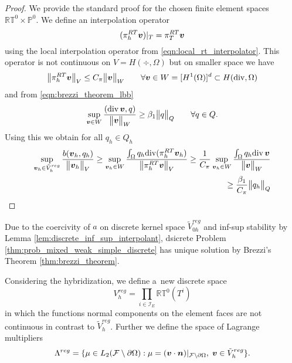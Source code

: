 \begin{proof}
We provide the standard proof for the chosen finite element spaces $\mathbb{RT}^0\times\mathbb{P}^0$.
We define an interpolation operator 
\begin{equation}
    (\pi^{RT}_h \mathbf{\boldsymbol{v}})|_T = \pi^{RT}_T \mathbf{\boldsymbol{v}}
\end{equation}
using the local interpolation operator from \eqref{eqn:local_rt_interpolator}.
This operator is not continuous on $V=H(\div,\Omega)$ but on
smaller space we have
\begin{equation}
    \bigl\Vert\pi^{RT}_h \mathbf{\boldsymbol{v}}\bigr\Vert_V \leq C_\pi \bigl\Vert\mathbf{\boldsymbol{v}}\bigr\Vert_W \qquad \forall \mathbf{\boldsymbol{v}}\in W=[H^1(\Omega)]^d \subset H({\rm div},\Omega)
\end{equation}
and from \eqref{eqn:brezzi_theorem_lbb}
\begin{equation}
    \sup_{\mathbf{\boldsymbol{v}}\in W} \frac{({\rm div}\,\mathbf{\boldsymbol{v}}, q)}{\bigl\Vert\mathbf{\boldsymbol{v}}\bigr\Vert_W} \geq \beta_1 \bigl\Vert q\bigr\Vert_Q \qquad \forall q\in Q.
\end{equation}
Using this we obtain for all $q_h\in Q_h$
\begin{align}
    \sup_{\mathbf{\boldsymbol{v}}_h\in \tilde V^{reg}_h} \frac{b(\mathbf{\boldsymbol{v}}_h,q_h)}{\bigl\Vert\mathbf{\boldsymbol{v}}_h\bigr\Vert_V} \geq
    \sup_{\mathbf{\boldsymbol{v}}_h\in W} \frac{\int_{\Omega} q_h {\rm div} (\pi^{RT}_h \mathbf{\boldsymbol{v}}_h)}{\bigl\Vert\pi^{RT}_h \mathbf{\boldsymbol{v}}\bigr\Vert_V} \geq
    \frac{1}{C_\pi} \sup_{\mathbf{\boldsymbol{v}}_h\in W} \frac{\int_{\Omega} q_h {\rm div}\,\mathbf{\boldsymbol{v}}}{\bigl\Vert\mathbf{\boldsymbol{v}}\bigr\Vert_W}
    \nonumber\\ \geq \frac{\beta_1}{C_\pi}\bigl\Vert q_h\bigr\Vert_Q
\end{align}
\end{proof}

Due to the coercivity of $a$ on discrete kernel space $\tilde V^{reg}_{0h}$
and inf-sup stability by Lemma \ref{lem:discrete_inf_sup_interpolant},
dsicrete Problem \ref{thm:prob_mixed_weak_simple_discrete} has unique solution by Brezzi's Theorem \ref{thm:brezzi_theorem}.

\vspace{10pt}
Considering the hybridization, we define a~new discrete space
\begin{equation}
    V_h^{reg} = \prod\limits_{i\in\mathcal{I}_E} \mathbb{RT}^0(T^i)
\end{equation}
in which the functions normal components on the element faces are not continuous
in contrast to $\tilde V_h^{reg}$.
Further we define the space of Lagrange multipliers
\begin{equation}
    \Lambda^{reg} = \{\mu\in L_2(\mathcal{F}\setminus\partial\Omega): \mu=(\mathbf{\boldsymbol{v}}\cdot\mathbf{\boldsymbol{n}})|_{\mathcal{F}\setminus\partial\Omega},\; \mathbf{\boldsymbol{v}}\in \tilde V_h^{reg}\}.
\end{equation}

